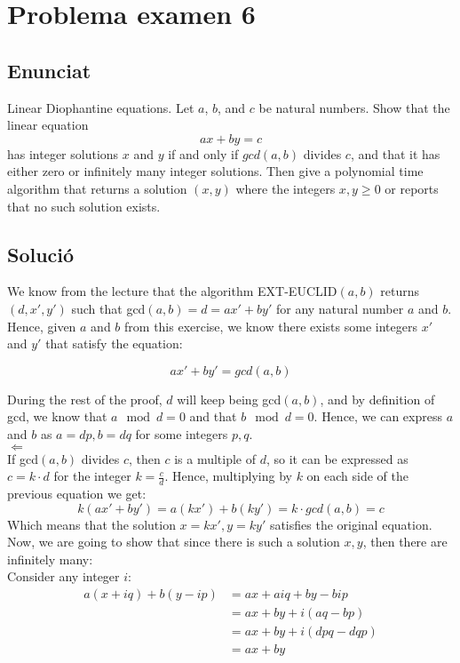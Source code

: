 \documentclass{article}
\author{Gonzalo Solera }
\date{June 2018}
\begin{document}
\section{Problema examen 6}
\subsection{Enunciat}
Linear Diophantine equations. Let $a$, $b$, and $c$ be natural numbers. Show that the linear equation
\[
ax + by = c
\]
has integer solutions $x$ and $y$ if and only if $gcd(a,b)$ divides $c$, and that it has either zero or infinitely many integer solutions. Then give a polynomial time algorithm that returns a solution $(x,y)$ where the integers $x,y \geq 0$ or reports that no such solution exists.

\subsection{Solució}



We know from the lecture that the algorithm EXT-EUCLID$(a, b)$ returns $(d, x', y')$ such that gcd$(a, b) = d = ax' + by'$ for any natural number $a$ and $b$. Hence, given $a$ and $b$ from this exercise, we know there exists some integers $x'$ and $y'$ that satisfy the equation:

$$
ax' + by' = gcd(a, b)
$$

During the rest of the proof, $d$ will keep being gcd$(a, b)$, and by definition of gcd, we know that $a \mod d = 0$ and that $b \mod d = 0$. Hence, we can express $a$ and $b$ as $a = dp, b = dq$ for some integers $p, q$. \\

$\Longleftarrow$ \\

If gcd$(a, b)$ divides $c$, then $c$ is a multiple of $d$, so it can be expressed as $c = k \cdot d$ for the integer $k = \frac{c}{d}$. Hence, multiplying by $k$ on each side of the previous equation we get:
$$
k(ax' + by') = a(kx') + b(ky') = k \cdot gcd(a, b) = c
$$
Which means that the solution $x = kx', y = ky'$ satisfies the original equation. Now, we are going to show that since there is such a solution $x, y$, then there are infinitely many: \\

Consider any integer $i$:
\begin{align*}
a(x+iq) + b(y-ip) 
&= ax + aiq + by - bip \\
&= ax + by + i(aq - bp) \\
&= ax + by + i(dpq - dqp) \\
&= ax + by
\end{align*}
\end{document}
